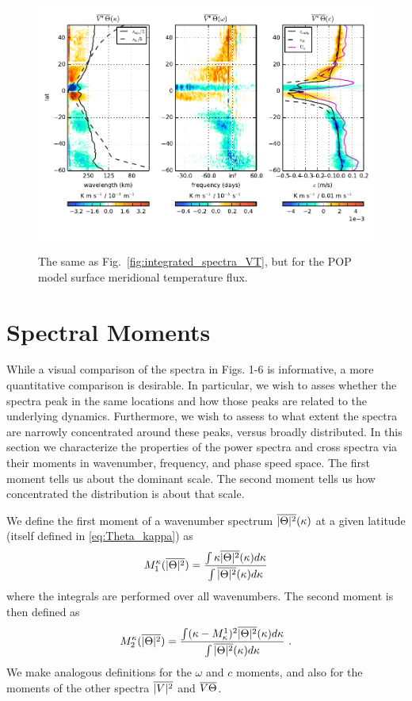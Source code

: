 \documentclass[10pt]{article}
\newcommand{\ol}{\ensuremath{\overline}}
\begin{document}
\begin{figure}[t]
  \noindent\includegraphics{../figures/POP_50degwide/integrated_spectra_VT.pdf}\\
  \caption{The same as Fig.~\ref{fig:integrated_spectra_VT}, but for the POP model surface meridional temperature flux.}
  \label{fig:integrated_spectra_VT_POP}
\end{figure}


\section{Spectral Moments}

While a visual comparison of the spectra in Figs. 1-6 is informative, a more quantitative comparison is desirable. In particular, we wish to asses whether the spectra peak in the same locations and how those peaks are related to the underlying dynamics. Furthermore, we wish to assess to what extent the spectra are narrowly concentrated around these peaks, versus broadly distributed. In this section we characterize the properties of the power spectra and cross spectra via their moments in wavenumber, frequency, and phase speed space. The first moment tells us about the dominant scale. The second moment tells us how concentrated the distribution is about that scale.

We define the first moment of a wavenumber spectrum $\ol{|\Theta|^2}(\kappa)$ at a given latitude (itself defined in \ref{eq:Theta_kappa}) as
\begin{equation}
M^\kappa_1 ( \ol{|\Theta|^2} ) = \frac{ \int \kappa \ol{|\Theta|^2}(\kappa) d \kappa }{ \int \ol{|\Theta|^2}(\kappa) d \kappa }
\label{eq:M1}
\end{equation}
where the integrals are performed over all wavenumbers. The second moment is then defined as
\begin{equation}
M^\kappa_2 (\ol{ |\Theta|^2 }) = \frac{ \int (\kappa - M^1_\kappa)^2 \ol{|\Theta|^2}(\kappa) d \kappa }{ \int \ol{|\Theta|^2}(\kappa) d \kappa } \ .
\label{eq:M2}
\end{equation}
We make analogous definitions for the $\omega$ and $c$ moments, and also for the moments of the other spectra $\ol{|V|^2}$ and $\ol{V \Theta}$. 
\end{document}

